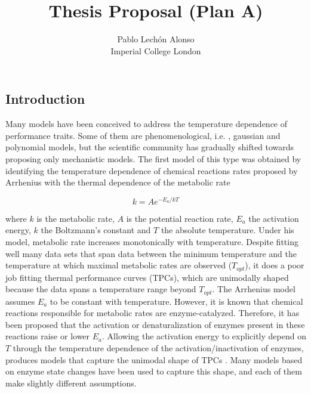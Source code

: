 \documentclass[titlepage,11pt]{article}
\begin{document}
	
	\title{\textbf{Thesis Proposal (Plan A)} }
	\author{Pablo Lechón Alonso \\ [30pt]
		Imperial College London}
	
	\maketitle
	\begin{linenumbers}
		\section{Introduction}
			 Many models have been conceived to address the temperature dependence of performance traits. Some of them are phenomenological, i.e. \cite{Ratkowsky1982, Lactin1995}, gaussian and polynomial models, but the scientific community has gradually shifted towards proposing only mechanistic models. The first model of this type was obtained by identifying the temperature dependence of chemical reactions rates proposed by Arrhenius \cite{Arrhenius1889} with the thermal dependence of the metabolic rate
			\begin{linenomath}
				\begin{equation}
				k = A e^{-E_a/kT}
				\end{equation}
			\end{linenomath}
			where $ k $ is the metabolic rate, $ A $ is the potential reaction rate, $ E_a $ the activation energy, $ k $ the Boltzmann's constant and $ T $ the absolute temperature. Under his model, metabolic rate increases monotonically with temperature. Despite fitting well many data sets that span data between the minimum temperature and the temperature at which maximal metabolic rates are observed ($ T_{opt} $), it does a poor job fitting thermal performance curves (TPCs), which are unimodally shaped because the data spans a temperature range beyond $ T_{opt} $. The Arrhenius model assumes $ E_a $ to be constant with temperature. However, it is known that chemical reactions responsible for metabolic rates are enzyme-catalyzed. Therefore, it has been proposed that the activation or denaturalization of enzymes present in these reactions raise or lower $ E_a $. Allowing the activation energy to explicitly depend on $ T $ through the temperature dependence of the activation/inactivation of enzymes, produces models that capture the unimodal shape of TPCs \cite{Johnson1946, Schoolfield1981, Ratkowsky2005, DeLong2017}. Many models based on enzyme state changes have been used to capture this shape, and each of them make slightly different assumptions.

\end{linenumbers}
\end{document}
